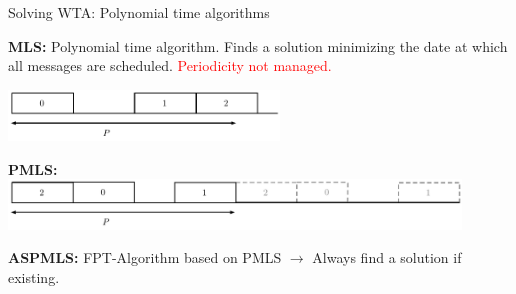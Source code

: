 \documentclass[10 pt]{beamer}
\begin{document}
\begin{frame}{Solving WTA: Polynomial time algorithms}

  
   \textbf{MLS:}  Polynomial time algorithm. Finds a solution minimizing the date at which all messages are scheduled. 
   \pause
   \textcolor{red}{Periodicity not managed.}      


   \pause 
 

   \includegraphics[width=0.54\textwidth]{pmls.pdf}
\pause

  \textbf{PMLS:} 
\includegraphics[width=0.9\textwidth]{pmls2.pdf}

 \pause

   \textbf{ASPMLS:} FPT-Algorithm based on PMLS $\rightarrow$ Always find a solution if existing.

\end{frame}
\end{document}
